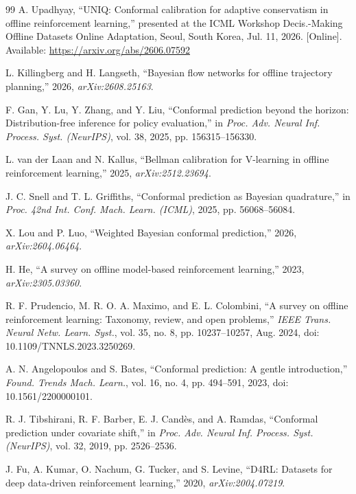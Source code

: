 \documentclass[conference]{IEEEtran}
\begin{document}
\begin{thebibliography}{99}
A. Upadhyay, ``UNIQ: Conformal calibration for adaptive conservatism in offline reinforcement learning,'' presented at the ICML Workshop Decis.-Making Offline Datasets Online Adaptation, Seoul, South Korea, Jul. 11, 2026. [Online]. Available: \url{https://arxiv.org/abs/2606.07592}

L. Killingberg and H. Langseth, ``Bayesian flow networks for offline trajectory planning,'' 2026, \emph{arXiv:2608.25163}.

F. Gan, Y. Lu, Y. Zhang, and Y. Liu, ``Conformal prediction beyond the horizon: Distribution-free inference for policy evaluation,'' in \emph{Proc. Adv. Neural Inf. Process. Syst. (NeurIPS)}, vol. 38, 2025, pp. 156315--156330.

L. van der Laan and N. Kallus, ``Bellman calibration for V-learning in offline reinforcement learning,'' 2025, \emph{arXiv:2512.23694}.

J. C. Snell and T. L. Griffiths, ``Conformal prediction as Bayesian quadrature,'' in \emph{Proc. 42nd Int. Conf. Mach. Learn. (ICML)}, 2025, pp. 56068--56084.

X. Lou and P. Luo, ``Weighted Bayesian conformal prediction,'' 2026, \emph{arXiv:2604.06464}.

H. He, ``A survey on offline model-based reinforcement learning,'' 2023, \emph{arXiv:2305.03360}.

R. F. Prudencio, M. R. O. A. Maximo, and E. L. Colombini, ``A survey on offline reinforcement learning: Taxonomy, review, and open problems,'' \emph{IEEE Trans. Neural Netw. Learn. Syst.}, vol. 35, no. 8, pp. 10237--10257, Aug. 2024, doi: 10.1109/TNNLS.2023.3250269.

A. N. Angelopoulos and S. Bates, ``Conformal prediction: A gentle introduction,'' \emph{Found. Trends Mach. Learn.}, vol. 16, no. 4, pp. 494--591, 2023, doi: 10.1561/2200000101.

R. J. Tibshirani, R. F. Barber, E. J. Cand\`es, and A. Ramdas, ``Conformal prediction under covariate shift,'' in \emph{Proc. Adv. Neural Inf. Process. Syst. (NeurIPS)}, vol. 32, 2019, pp. 2526--2536.

J. Fu, A. Kumar, O. Nachum, G. Tucker, and S. Levine, ``D4RL: Datasets for deep data-driven reinforcement learning,'' 2020, \emph{arXiv:2004.07219}.


\end{thebibliography}
\end{document}
